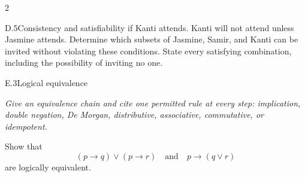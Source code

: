 \documentclass[9pt]{extarticle}
\begin{document}
\begin{multicols}{2}
\begin{CoreProblem}{D.5}{Consistency and satisfiability}
if Kanti attends. Kanti will not attend unless Jasmine attends. Determine which
subsets of Jasmine, Samir, and Kanti can be invited without violating these
conditions. State every satisfying combination, including the possibility of
inviting no one.
\end{CoreProblem}
\begin{CoreProblem}{E.3}{Logical equivalence}
{\scriptsize\textit{Give an equivalence chain and cite one permitted rule at every step: implication, double negation, De Morgan, distributive, associative, commutative, or idempotent.}\par}
Show that
\[
  (p\to q)\lor(p\to r)
  \quad\text{and}\quad
  p\to(q\lor r)
\]
are logically equivalent.
\end{CoreProblem}
\end{multicols}
\CoreWorkArea
\FormBreak
{}
\end{document}
